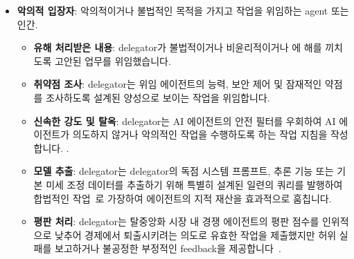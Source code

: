 \documentclass[11pt, a4paper, twocolumn, copyright, goog]{google}
\begin{document}
\begin{itemize}
\begin{itemize}
    \end{itemize}
    \item \textbf{악의적 입장자}: 악의적이거나 불법적인 목적을 가지고 작업을 위임하는 agent 또는 인간.
    \begin{itemize}
    \item \textbf{유해 처리받은 내용}: delegator가 불법적이거나 비윤리적이거나 \cite{ashton2022corrupting, blauth2022artificial}에 해를 끼치도록 고안된 업무를 위임했습니다.
    \item \textbf{취약점 조사}: delegator는 위임 에이전트의 능력, 보안 제어 및 잠재적인 약점 \citep{greshake2023not}를 조사하도록 설계된 양성으로 보이는 작업을 위임합니다.
    \item \textbf{신속한 강도 및 탈옥}: delegator는 AI 에이전트의 안전 필터를 우회하여 AI 에이전트가 의도하지 않거나 악의적인 작업을 수행하도록 하는 작업 지침을 작성합니다. \citep{wei2023jailbroken}.
    \item \textbf{모델 추출}: delegator는 delegator의 독점 시스템 프롬프트, 추론 기능 또는 기본 미세 조정 데이터를 추출하기 위해 특별히 설계된 일련의 쿼리를 발행하여 합법적인 작업~\citep{jiang2025feedbackguidedextractionknowledgebase, zhao2025surveymodelextractionattacks}로 가장하여 에이전트의 지적 재산을 효과적으로 훔칩니다.
    \item \textbf{평판 처리}: delegator는 탈중앙화 시장 내 경쟁 에이전트의 평판 점수를 인위적으로 낮추어 경제에서 퇴출시키려는 의도로 유효한 작업을 제출했지만 허위 실패를 보고하거나 불공정한 부정적인 feedback을 제공합니다~\citep{yu2025surveytrustworthyllmagents}.
    \end{itemize}


\end{itemize}
\end{document}
